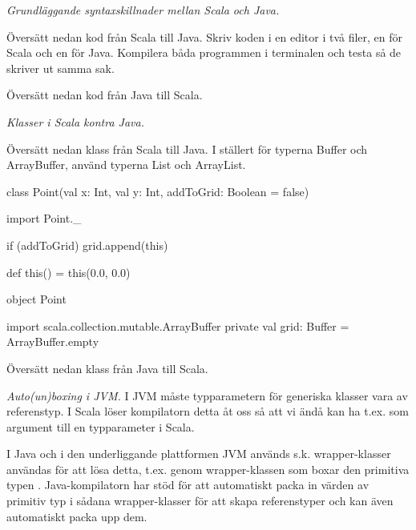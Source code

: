 

\Exercise{\ExeWeekELEVEN}\label{exe:W11}

\begin{Goals}
\item \TODO
\end{Goals}

\begin{Preparations}
\item {} 
\end{Preparations}

\BasicTasks %

\TODO

\Task \emph{Grundläggande syntaxskillnader mellan Scala och Java.} 

\Subtask Översätt nedan kod från Scala till Java. Skriv koden i en editor i två filer, en för Scala och en för Java. Kompilera båda programmen i terminalen och testa så de skriver ut samma sak. 

\begin{Code}
\end{Code}

\Subtask Översätt nedan kod från Java till Scala.


\Task \emph{Klasser i Scala kontra Java.}  

\Subtask Översätt nedan klass från Scala till Java. I ställert för typerna Buffer och ArrayBuffer, använd typerna List och ArrayList.

\begin{Code}
class Point(val x: Int, val y: Int, addToGrid: Boolean = false) {
  import Point._
  
  if (addToGrid) grid.append(this)
  
  def this() = this(0.0, 0.0)
  
  
}
object Point {
  import scala.collection.mutable.ArrayBuffer
  private val grid: Buffer = ArrayBuffer.empty
  
}
\end{Code}

\Subtask Översätt nedan klass från Java till Scala. 


\Task \emph{Auto(un)boxing i JVM.} I JVM måste typparametern för generiska klasser vara av referenstyp. I Scala löser kompilatorn detta åt oss så att vi ändå kan ha t.ex.  som argument till en typparameter i Scala. 

I Java och i den underliggande plattformen JVM används s.k. wrapper-klasser användas för att lösa detta, t.ex. genom wrapper-klassen  som boxar den primitiva typen . Java-kompilatorn har stöd för att automatiskt packa in värden av primitiv typ i sådana wrapper-klasser för att skapa referenstyper och kan även automatiskt packa upp dem. 

